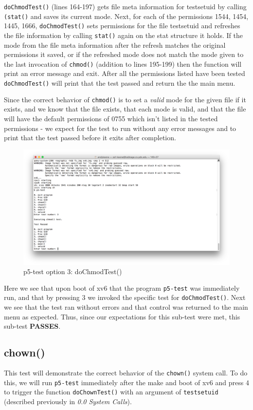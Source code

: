\documentclass[11pt,letterpaper]{report}
\begin{document}
	{\tt doChmodTest()} (lines 164-197)  gets file meta information for testsetuid by calling {\tt (stat()} and saves its current mode. Next, for each of the permissions 1544, 1454, 1445, 1666,
	{\tt doChmodTest()} sets permissions for the file testsetuid and refreshes the file information by calling {\tt stat()} again on the stat structure it holds. If the mode from 
	the file meta information after the refresh matches the original permissions it saved, or if the refreshed mode does not match the mode given to the last invocation of {\tt chmod()} 
	(addition to lines 195-199) then the function will print an error message and exit. After all the permissions listed have been tested {\tt doChmodTest()} will print that the test passed and
	return the the main menu. 
	
	Since the correct behavior of {\tt chmod()} is to set a \emph{valid} mode for the given file if it exists,
	and we know that the file exists, that each mode is valid, and that the file will have the default permissions of 0755 which isn't listed in the tested permissions - 
	we expect for the test to run without any error messages and to print that the test passed before
	it exits after completion.
	
\begin{figure}[h!]
\centering
\includegraphics[width=0.8\linewidth]{dochmodtest.png}
\caption{p5-test option 3: doChmodTest()}
\label{fig:datetest}
\end{figure}

\pagebreak
Here we see that upon boot of xv6 that the program {\tt p5-test} was immediately run, and that by pressing 3 we invoked the specific test for {\tt doChmodTest()}. Next we see that the test ran without
errors and that control was returned to the main menu as expected. Thus, since our expectations for this sub-test were met, this sub-test \textbf{PASSES}.


	\subsection{chown()}
	This test will demonstrate the correct behavior of the {\tt chown()} system call. To do this, we will run {\tt p5-test} immediately after the make and boot of xv6 
	and press 4 to trigger the function {\tt doChownTest()} with an argument of {\tt testsetuid} (described previously in \emph{0.0 System Calls}). 
	
\end{document}
